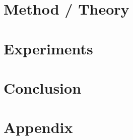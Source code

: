 \documentclass{article} %
\begin{document}
\section{Method / Theory}

\section{Experiments}

\section{Conclusion}




\appendix
\section{Appendix}
\end{document}
